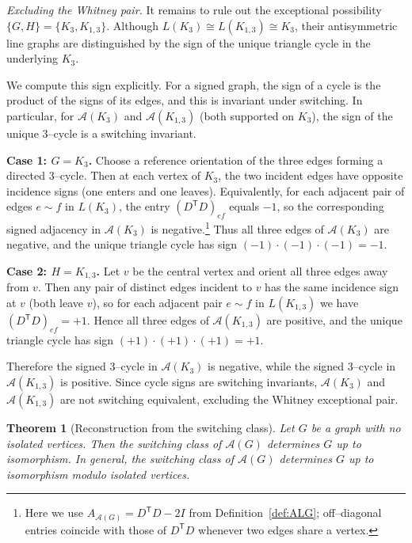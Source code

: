 \documentclass[11pt]{article}
\newtheorem{theorem}{Theorem}
\theoremstyle{plain}
\begin{document}
\medskip
\noindent\emph{Excluding the Whitney pair.}
It remains to rule out the exceptional possibility
$\{G,H\}=\{K_3,K_{1,3}\}$.
Although $L(K_3)\cong L(K_{1,3})\cong K_3$, their antisymmetric line graphs are
distinguished by the sign of the unique triangle cycle in the underlying $K_3$.

We compute this sign explicitly.
For a signed graph, the sign of a cycle is the product of the signs of its
edges, and this is invariant under switching.
In particular, for $\mathcal{A}(K_3)$ and $\mathcal{A}(K_{1,3})$ (both supported
on $K_3$), the sign of the unique $3$--cycle is a switching invariant.

\smallskip
\noindent\textbf{Case 1: $G=K_3$.}
Choose a reference orientation of the three edges forming a directed $3$--cycle.
Then at each vertex of $K_3$, the two incident edges have opposite incidence
signs (one enters and one leaves).
Equivalently, for each adjacent pair of edges $e\sim f$ in $L(K_3)$, the entry
$(D^{\mathsf T} D)_{ef}$ equals $-1$, so the corresponding signed adjacency in
$\mathcal{A}(K_3)$ is negative.\footnote{Here we use
$A_{\mathcal{A}(G)}=D^{\mathsf T} D-2I$ from Definition~\ref{def:ALG}; off--diagonal entries
coincide with those of $D^{\mathsf T} D$ whenever two edges share a vertex.}
Thus all three edges of $\mathcal{A}(K_3)$ are negative, and the unique triangle
cycle has sign $(-1)\cdot(-1)\cdot(-1)=-1$.

\smallskip
\noindent\textbf{Case 2: $H=K_{1,3}$.}
Let $v$ be the central vertex and orient all three edges away from $v$.
Then any pair of distinct edges incident to $v$ has the same incidence sign at
$v$ (both leave $v$), so for each adjacent pair $e\sim f$ in $L(K_{1,3})$ we have
$(D^{\mathsf T} D)_{ef}=+1$.
Hence all three edges of $\mathcal{A}(K_{1,3})$ are positive, and the unique
triangle cycle has sign $(+1)\cdot(+1)\cdot(+1)=+1$.

Therefore the signed $3$--cycle in $\mathcal{A}(K_3)$ is negative, while the
signed $3$--cycle in $\mathcal{A}(K_{1,3})$ is positive.
Since cycle signs are switching invariants, $\mathcal{A}(K_3)$ and
$\mathcal{A}(K_{1,3})$ are not switching equivalent, excluding the Whitney
exceptional pair.

\begin{theorem}[Reconstruction from the switching class]
\label{thm:reconstruction}
Let $G$ be a graph with no isolated vertices. Then the switching class of $\mathcal A(G)$
determines $G$ up to isomorphism. In general, the switching class of $\mathcal A(G)$
determines $G$ up to isomorphism modulo isolated vertices.
\end{theorem}
\end{document}

